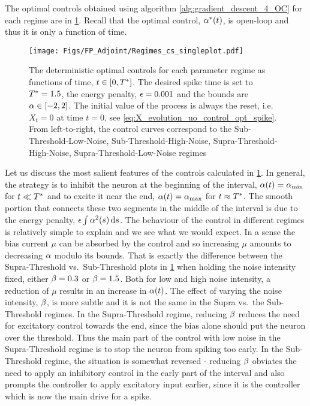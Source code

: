 The optimal controls obtained using algorithm \ref{alg:gradient_descent_4_OC} for each regime are in
\cref{fig:FBK_Regimes_cs}. Recall that the optimal control, $\alpha^*(t)$, is open-loop and thus it is only a function of time.
\begin{figure}[htp]
\begin{center}
  \texttt{[image: Figs/FP\_Adjoint/Regimes\_cs\_singleplot.pdf]}
  \caption[Open-loop Optimal Control numerical solution]{The deterministic
  optimal controls for each parameter regime as functions of time, $t \in [0, { T^* }]$.
  The desired spike time is set to ${ T^* }=1.5$, the energy penalty, ${\epsilon}
  = 0.001$ and the bounds are $\alpha \in [-2,2]$.
  The initial value of the process is always the reset, i.e. $X_t=0$ at
time $t=0$, see \cref{eq:X_evolution_uo_control_opt_spike}.
  From left-to-right, the control curves correspond to the
  Sub-Threshold-Low-Noise, Sub-Threshold-High-Noise, Supra-Threshold-High-Noise,
  Supra-Threshold-Low-Noise regimes
  }
  \label{fig:FBK_Regimes_cs}
\end{center}  
\end{figure}   

Let us discuss the most salient features of the controls calculated in
\cref{fig:FBK_Regimes_cs}. In general, the strategy is to inhibit the neuron at
the beginning of the interval, $\alpha(t) = { \alpha_{\textrm{min}} }$ for $t \ll { T^* }$ and to excite it
near the end, $\alpha(t) = { \alpha_{\textrm{max}} }$ for $t \approx { T^* }$. The smooth portion that
connects these two segments in the middle of the interval is due to the energy
penalty, ${\epsilon} \int \alpha^2(s) \, \mathrm{d} s$. The behaviour of the control in different
regimes is relatively simple to explain and we see what we would expect. In a
sense the bias current $\mu$ can be absorbed by the control and so increasing
$\mu$ amounts to decreasing $\alpha$ modulo its bounds. That is exactly the
difference between the Supra-Threshold vs.\ Sub-Threshold plots in
\cref{fig:FBK_Regimes_cs} when holding the noise intensity fixed, either
$\beta=0.3$ or $\beta=1.5$. Both for low and high noise intensity, a reduction of $\mu$
results in an increase in $\alpha(t)$. 
The effect of varying the noise intensity, $\beta$, is more subtle and it is not
the same in the Supra vs.\ the Sub-Threshold regimes. In the
Supra-Threshold regime, reducing $\beta$ reduces the need for
excitatory control towards the end, since the bias alone should put the neuron
over the threshold. Thus the main part of the control with low noise in the
Supra-Threshold regime is to stop the neuron from spiking too early. In the
Sub-Threshold regime, the situation is somewhat reversed - reducing
$\beta$ obviates the need to apply an inhibitory control in the early part of the
interval and also prompts the controller to apply excitatory input earlier,
since it is the controller which is now the main drive for a spike.

